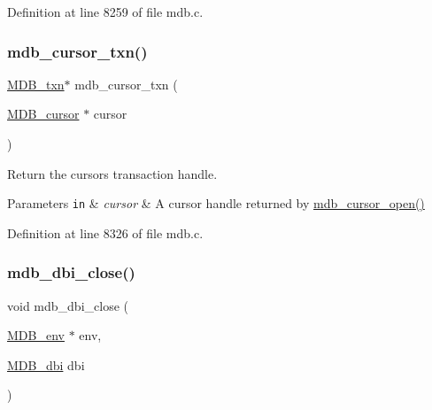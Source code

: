 Definition at line 8259 of file mdb.\+c.

\mbox{\label{group__internal_gabec1312ed0392d06b73e5a3c9629c673}} 
\subsubsection{\texorpdfstring{mdb\+\_\+cursor\+\_\+txn()}{mdb\_cursor\_txn()}}
{\footnotesize\ttfamily \mbox{\hyperlink{struct_m_d_b__txn}{M\+D\+B\+\_\+txn}}$\ast$ mdb\+\_\+cursor\+\_\+txn (\begin{DoxyParamCaption}\item[{\mbox{\hyperlink{struct_m_d_b__cursor}{M\+D\+B\+\_\+cursor}} $\ast$}]{cursor }\end{DoxyParamCaption})}



Return the cursor\textquotesingle{}s transaction handle. 


\begin{DoxyParams}[1]{Parameters}
\mbox{\tt in}  & {\em cursor} & A cursor handle returned by \mbox{\hyperlink{group__mdb_ga9ff5d7bd42557fd5ee235dc1d62613aa}{mdb\+\_\+cursor\+\_\+open()}} \\
\hline
\end{DoxyParams}


Definition at line 8326 of file mdb.\+c.

\mbox{\label{group__internal_ga52dd98d0c542378370cd6b712ff961b5}} 
\subsubsection{\texorpdfstring{mdb\+\_\+dbi\+\_\+close()}{mdb\_dbi\_close()}}
{\footnotesize\ttfamily void mdb\+\_\+dbi\+\_\+close (\begin{DoxyParamCaption}\item[{\mbox{\hyperlink{struct_m_d_b__env}{M\+D\+B\+\_\+env}} $\ast$}]{env,  }\item[{\mbox{\hyperlink{group__mdb_gadbe68a06c448dfb62da16443d251a78b}{M\+D\+B\+\_\+dbi}}}]{dbi }\end{DoxyParamCaption})}




